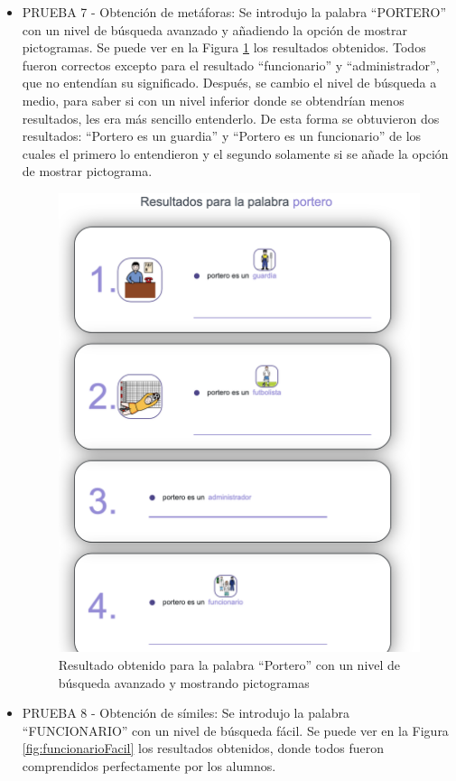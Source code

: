 \begin{itemize}
	\item PRUEBA 7 - Obtención de metáforas:  Se introdujo la palabra ``PORTERO'' con un nivel de búsqueda avanzado y añadiendo la opción de mostrar pictogramas. Se puede ver en la Figura \ref{fig:porteroAvanzado} los resultados obtenidos. Todos fueron correctos excepto para el resultado ``funcionario'' y ``administrador'', que no entendían su significado. Después, se cambio el nivel de búsqueda a medio, para saber si con un nivel inferior donde se obtendrían menos resultados, les era más sencillo entenderlo. De esta forma se obtuvieron dos resultados: ``Portero es un guardia'' y ``Portero es un funcionario'' de los cuales el primero lo entendieron y el segundo solamente si se añade la opción de mostrar pictograma.
	
	\begin{figure}[!h]
		\includegraphics[width=.7\textwidth]{Imagenes/Bitmap/Capitulo4/EvaluacionFinal/7porteroavanzadopictos.png}
		\centering
		\caption{Resultado obtenido para la palabra ``Portero'' con un nivel de búsqueda avanzado y mostrando pictogramas}
		\label{fig:porteroAvanzado}
	\end{figure}

\item PRUEBA 8 - Obtención de símiles:  Se introdujo la palabra ``FUNCIONARIO'' con un nivel de búsqueda fácil. Se puede ver en la Figura \ref{fig:funcionarioFacil} los resultados obtenidos, donde todos fueron comprendidos perfectamente por los alumnos. 


\end{itemize}

